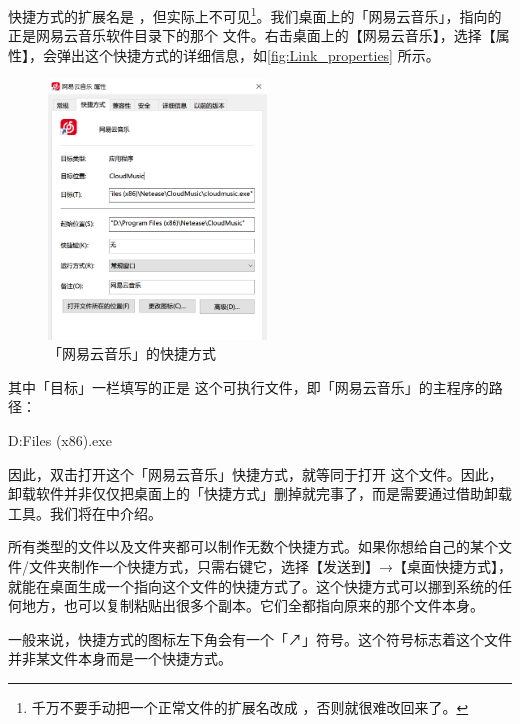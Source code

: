 {{快捷方式的扩展名是 ，但实际上不可见\cprotect\footnote{千万不要手动把一个正常文件的扩展名改成 ，否则就很难改回来了。}。我们桌面上的「网易云音乐」，指向的正是网易云音乐软件目录下的那个  文件。右击桌面上的【网易云音乐】，选择【属性】，会弹出这个快捷方式的详细信息，如\autoref{fig:Link_properties} 所示。

\begin{figure}
  \centering
  \includegraphics[width=5.8cm]{assets/basic/Link_properties.png}
  \caption{「网易云音乐」的快捷方式}
  \label{fig:Link_properties}
\end{figure}

其中「目标」一栏填写的正是  这个可执行文件，即「网易云音乐」的主程序的路径：

\begin{MissingVerbatim}
  D:\Program Files (x86)\Netease\CloudMusic\cloudmusic.exe
\end{MissingVerbatim}

因此，双击打开这个「网易云音乐」快捷方式，就等同于打开  这个文件。\cprotect{}因此，卸载软件并非仅仅把桌面上的「快捷方式」删掉就完事了，而是需要通过借助卸载工具。我们将在中介绍。

所有类型的文件以及文件夹都可以制作无数个快捷方式。如果你想给自己的某个文件/文件夹制作一个快捷方式，只需右键它，选择【发送到】→【桌面快捷方式】，就能在桌面生成一个指向这个文件的快捷方式了。这个快捷方式可以挪到系统的任何地方，也可以复制粘贴出很多个副本。它们全都指向原来的那个文件本身。

一般来说，快捷方式的图标左下角会有一个「↗」符号。这个符号标志着这个文件并非某文件本身而是一个快捷方式。

}}

